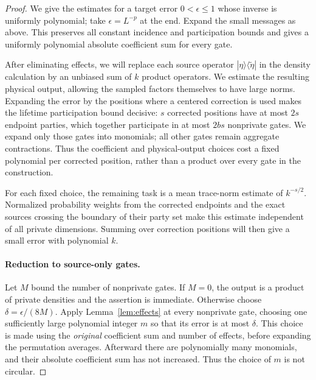 \documentclass[11pt]{article}
\numberwithin{equation}{section}
\theoremstyle{definition}
\theoremstyle{remark}
\begin{document}
\begin{proof}
We give the estimates for a target error $0<\epsilon\le1$ whose inverse
is uniformly polynomial; take $\epsilon=L^{-p}$ at the end.  Expand the
small messages as above.  This preserves all constant incidence and
participation bounds and gives a uniformly polynomial absolute
coefficient sum for every gate.

After eliminating effects, we will replace each source operator
$|\eta\rangle\langle\widetilde\eta|$ in the density calculation by an
unbiased sum of $k$ product operators.  We estimate the resulting physical
output, allowing the sampled factors themselves to have large norms.
Expanding the error by the positions where a centered correction is used
makes the lifetime participation bound decisive: $s$ corrected positions
have at most $2s$ endpoint parties, which together participate in at most
$2bs$ nonprivate gates.  We expand only those gates into monomials; all
other gates remain aggregate contractions.  Thus the coefficient and
physical-output choices cost a fixed polynomial per corrected position,
rather than a product over every gate in the construction.

For each fixed choice, the remaining task is a mean trace-norm estimate
of $k^{-s/2}$.  Normalized probability weights from the corrected endpoints
and the exact sources crossing the boundary of their party set make this
estimate
independent of all private dimensions.  Summing over correction positions
will then give a small error with polynomial $k$.

\paragraph{Reduction to source-only gates.}
Let $M$ bound the number of nonprivate gates.  If $M=0$, the output is a
product of private densities and the assertion is immediate.  Otherwise
choose $\delta=\epsilon/(8M)$.  Apply Lemma~\ref{lem:effects} at every
nonprivate gate, choosing one sufficiently large polynomial integer $m$
so that its error is at most $\delta$.  This choice is made using the
\emph{original} coefficient sum and number of effects, before expanding
the permutation averages.  Afterward there are polynomially many
monomials, and their absolute coefficient sum has not increased.  Thus
the choice of $m$ is not circular.


\end{proof}
\end{document}
